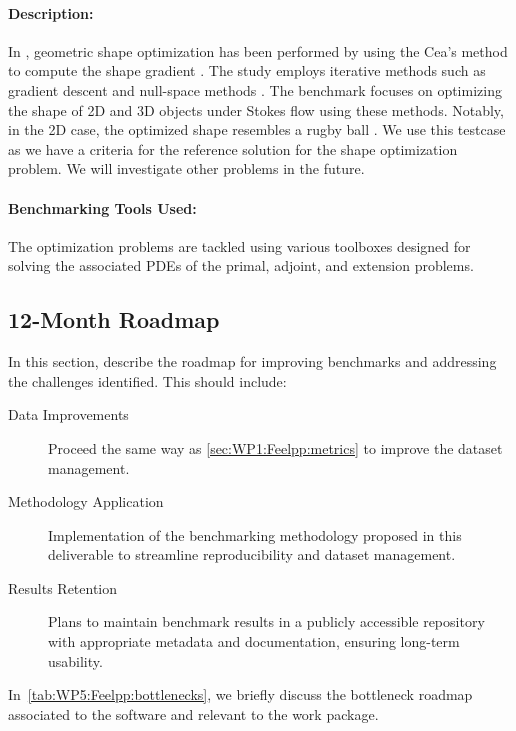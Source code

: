 \paragraph{Description:} In \cite{palazzolo2023shape}, geometric shape optimization has been performed by using the Cea's method to compute the shape gradient \cite{cea_conception_1986}. The study employs iterative methods such as gradient descent and null-space methods \cite{feppon_f_null_2020}. The benchmark focuses on optimizing the shape of 2D and 3D objects under Stokes flow using these methods. Notably, in the 2D case, the optimized shape resembles a rugby ball \cite{pironneau_optimum_1974}. We use this testcase as we have a criteria for the reference solution for the shape optimization problem. We will investigate other problems in the future.

\paragraph{Benchmarking Tools Used:} The optimization problems are tackled using various \Feelpp toolboxes designed for solving the associated PDEs of the primal, adjoint, and extension problems.


\subsection{12-Month Roadmap}
\label{sec:WP5:Feelpp:roadmap}

In this section, describe the roadmap for improving benchmarks and addressing the challenges identified. This should include:
\begin{description}
    \item[Data Improvements] Proceed the same way as \cref{sec:WP1:Feelpp:metrics} to improve the dataset management.
    \item[Methodology Application] Implementation of the benchmarking methodology proposed in this deliverable to streamline reproducibility and dataset management.
    \item[Results Retention] Plans to maintain benchmark results in a publicly accessible repository with appropriate metadata and documentation, ensuring long-term usability.
\end{description}

In~\cref{tab:WP5:Feelpp:bottlenecks}, we briefly discuss the bottleneck roadmap associated to the software and relevant to the work package.

